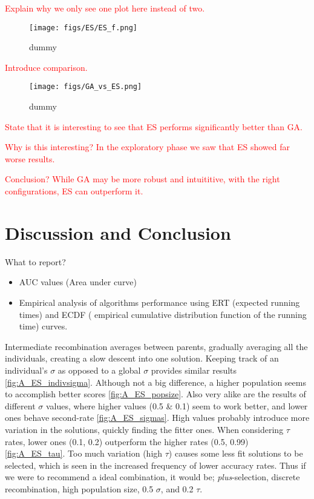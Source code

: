 \documentclass{article}
\newcommand{\todo}[1]{\textcolor{red}{#1}}
\begin{document}
\todo{Explain why we only see one plot here instead of two.}

\begin{figure*}[htbp]
    \centering
    \texttt{[image: figs/ES/ES\_f.png]}
    \captionsetup{width=.75\textwidth}
    \caption{dummy}
    \label{fig:ES_f}
\end{figure*}

\newpage

\todo{Introduce comparison.}

\begin{figure*}[htbp]
    \centering
    \texttt{[image: figs/GA\_vs\_ES.png]}
    \captionsetup{width=.75\textwidth}
    \caption{dummy}
    \label{fig:GA_vs_ES}
\end{figure*}

\todo{State that it is interesting to see that ES performs significantly better than GA.}

\todo{Why is this interesting? In the exploratory phase we saw that ES showed far worse results.}

\todo{Conclusion? While GA may be more robust and intuititive, with the right configurations, ES can outperform it.}

\newpage

\section{Discussion and Conclusion}
\label{sec:disres}

What to report? 
\begin{itemize}
    \item AUC values (Area under curve) 
    \item Empirical analysis of algorithms performance using ERT (expected running times) and ECDF ( empirical cumulative distribution function of the running time) curves. 
\end{itemize}

Intermediate recombination averages between parents, gradually averaging all the individuals, creating a slow descent into one solution.  
Keeping track of an individual's $\sigma$ as opposed to a global $\sigma$ provides similar results \ref{fig:A_ES_indivsigma}.
Although not a big difference, a higher population seems to accomplish better scores \ref{fig:A_ES_popsize}. 
Also very alike are the results of different $\sigma$ values, where higher values (0.5 \& 0.1) seem to work better, and lower ones behave second-rate \ref{fig:A_ES_sigmas}. 
High values probably introduce more variation in the solutions, quickly finding the fitter ones.
When considering $\tau$ rates, lower ones (0.1, 0.2) outperform the higher rates (0.5, 0.99) \ref{fig:A_ES_tau}.
Too much variation (high $\tau$) causes some less fit solutions to be selected, which is seen in the increased frequency of lower accuracy rates.
Thus if we were to recommend a ideal combination, it would be; \textit{plus}-selection, discrete recombination, high population size, 0.5 $\sigma$, and 0.2 $\tau$. 
\end{document}
